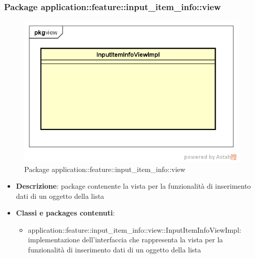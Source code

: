 \subsubsection{Package application::feature::input\_item\_info::view}
\label{Package application::feature::input_item_info::view}
\begin{figure}[H]
	\centering
	\includegraphics[scale=0.5]{Sezioni/Packages/Application/input_item_info_view.png}
	\caption{Package application::feature::input\_item\_info::view}
\end{figure}
\begin{itemize}
	\item \textbf{Descrizione}: package contenente la vista per la funzionalità di inserimento dati di un oggetto della lista
	\item \textbf{Classi e packages contenuti}:
	\begin{itemize}
	\item application::feature::input\_item\_info::view::InputItemInfoViewImpl: implementazione dell'interfaccia che rappresenta la vista per la funzionalità di inserimento dati di un oggetto della lista
	\end{itemize}
\end{itemize}

